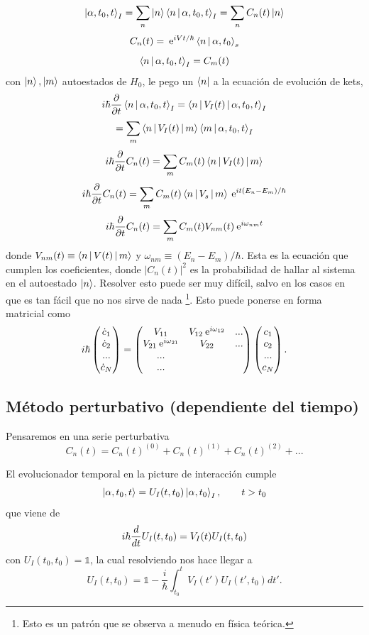 \documentclass[10pt,oneside]{CBFT_book}
\begin{document}
\[
	\Ket{\alpha,t_0,t}_I = \sum_n \Ket{n}\Braket{n|\alpha,t_0,t}_I = \sum_n C_n(t) \Ket{n}
\]
\[
	C_n(t) = \:\mathrm{e}^{iVt/\hbar} \Braket{n|\alpha,t_0}_s
\]
\[
	\Braket{n|\alpha,t_0,t}_I = C_m(t)
\]
con $\Ket{n},\ket{m}$ autoestados de $H_0$, le pego un $\Bra{n}$ a la ecuación de evolución de kets,
\[
	i\hbar \frac{\partial^{\hspace{-0.05em}} {}}{\partial {t}^{\hspace{-0.05em}}} \Braket{n|\alpha,t_0,t}_I = \Braket{n|V_I(t)|\alpha,t_0,t}_I
\]
\[
	= \sum_m \Braket{n|V_I(t)|m}\Braket{m|\alpha,t_0,t}_I
\]
\[
	i\hbar \frac{\partial^{\hspace{-0.05em}} {}}{\partial {t}^{\hspace{-0.05em}}}C_n(t) = \sum_m C_m(t) \Braket{n|V_I(t)|m}
\]
\[
	i\hbar \frac{\partial^{\hspace{-0.05em}} {}}{\partial {t}^{\hspace{-0.05em}}}C_n(t) = \sum_m C_m(t) \Braket{n|V_s|m} \:\mathrm{e}^{it(E_n-E_m)/\hbar}
\]
\[
	i\hbar \frac{\partial^{\hspace{-0.05em}} {}}{\partial {t}^{\hspace{-0.05em}}}C_n(t) = \sum_m C_m(t) V_{nm}(t) \:\mathrm{e}^{i\omega_{nm}t}
\]
donde $V_{nm}(t) \equiv \Braket{n|V(t)|m}$ y $\omega_{nm} \equiv (E_n-E_m)/\hbar$.
Esta es la ecuación que cumplen los coeficientes, donde $|C_n(t)|^2$ es la probabilidad de hallar al sistema 
en el autoestado $\Ket{n}$.
Resolver esto puede ser muy difícil, salvo en los casos en que es tan fácil que no nos
sirve de nada \footnote{Esto es un patrón que se observa a menudo en física teórica.}.
Esto puede ponerse en forma matricial como
\[
	i\hbar \begin{pmatrix}
	\dot{c}_1 \\ \dot{c}_2 \\ ... \\ \dot{c}_N \\
	\end{pmatrix} 
	=
	\begin{pmatrix}
	V_{11} & V_{12}\:\mathrm{e}^{i\omega_{12}} & ... \\ 
	V_{21}\:\mathrm{e}^{i\omega_{21}} & V_{22} & ... \\ 
	... \\ 
	... \\
	\end{pmatrix}
	\begin{pmatrix}
	c_1 \\ c_2 \\ ... \\ c_N \\
	\end{pmatrix} .
\]


\subsection{Método perturbativo (dependiente del tiempo)}

Pensaremos en una serie perturbativa 
\[
	C_n(t) = C_n(t)^{(0)} + C_n(t)^{(1)}  + C_n(t)^{(2)}  + ...
\]

El evolucionador temporal en la picture de interacción cumple 
\[
	\Ket{\alpha,t_0,t} = U_I(t,t_0)\Ket{\alpha,t_0}_I, \qquad t > t_0
\]
que viene de  
\[
	i\hbar \frac{d^{\hspace{-0.05em}} {}}{d {t}^{\hspace{-0.05em}}} U_I(t,t_0) = V_I(t) U_I(t,t_0)
\]
con $U_I(t_0,t_0)=\mathbb{1}$, la cual resolviendo nos hace llegar a 
\[
	U_I(t,t_0) = \mathbb{1} - \frac{i}{\hbar}\int_{t_0}^{t} V_I(t')U_I(t',t_0) dt'.
\]
\end{document}
